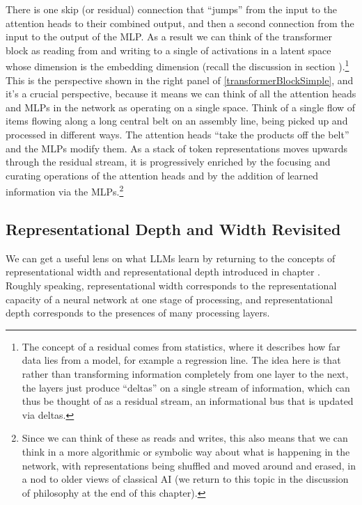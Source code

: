 There is one skip (or residual) connection that ``jumps'' from the input to the attention heads to their combined output, and then a second connection from the input to the output of the MLP. As a result we can think of the transformer block as reading
from and writing to a single  of activations in a
latent space \cite{elhage2021mathematical, milliere2024philosophical2} whose
dimension is the embedding dimension (recall the discussion in section
).\footnote{The concept of a residual comes from statistics, where it describes how far data lies from a model, for example a regression line. The idea
here is that rather than transforming information completely from one layer to
the next,  the layers just produce ``deltas'' on a single stream of
information, which can thus be thought of as a residual stream, an informational bus that is updated via deltas.} This is the
perspective shown in the right panel of \ref{transformerBlockSimple}, and it's
a crucial perspective, because it means we can think of all the attention heads and MLPs in the network as operating on a single space. Think of a single flow of items flowing along a long central belt on an assembly line, being picked up and processed in different ways. The attention heads ``take the products off the belt'' and the MLPs modify them. As a stack of token representations moves upwards through the
residual stream, it is progressively enriched by the focusing and curating operations of the attention heads and by the addition of learned information via the MLPs.\footnote{Since we can think of these as reads and writes, this
also means that we can think in a more algorithmic or symbolic way about what
is happening in the network, with representations being shuffled and moved
around and erased, in a nod to older views of classical AI (we return to
this topic in the discussion of philosophy at the end of this chapter).} 

\subsection{Representational Depth and Width Revisited} 

We can get a useful lens on what LLMs learn by returning to the concepts of
representational width and representational depth introduced in chapter .  Roughly speaking, representational width corresponds to the representational capacity of a neural network at one stage of processing, and representational depth corresponds to the presences of many processing layers.
 
